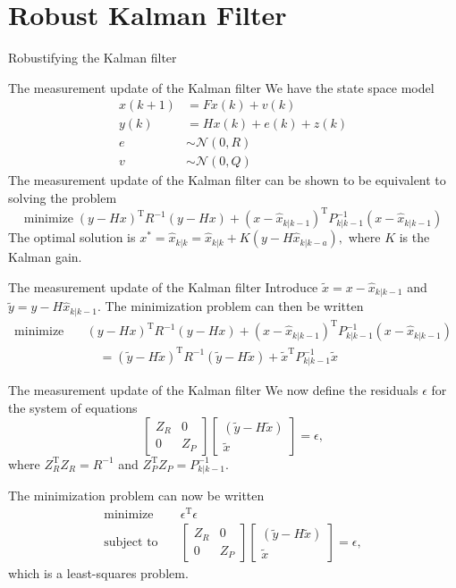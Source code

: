 \documentclass[presentation,aspectratio=169]{beamer}
\renewcommand{\transp}{^{\mathrm{T}}}
\begin{document}
\section{Robust Kalman Filter}
\label{sec-3}
\begin{frame}[label=sec-3-1]{Robustifying the Kalman filter}
\end{frame}
\begin{frame}[label=sec-3-2]{The measurement update of the Kalman filter}
We have the state space model
\begin{align*}
x(k+1) &= Fx(k) + v(k)\\
y(k) &= Hx(k) + e(k) + z(k)\\
e &\sim \mathcal{N}(0,R)\\
v &\sim \mathcal{N}(0,Q)
\end{align*}
The measurement update of the Kalman filter can be shown to be equivalent to solving the problem
\[ \text{minimize} \; (y-Hx)^{\mathrm{T}} R^{-1}(y-Hx) + (x-\hat{x}_{k|k-1})\transp P_{k|k-1}^{-1}(x-\hat{x}_{k|k-1}) \]
The optimal solution is \( x^*=\hat{x}_{k|k} = \hat{x}_{k|k} + K(y-H\hat{x}_{k|k-a}),\) where $K$ is the Kalman gain.
\end{frame}
\begin{frame}[label=sec-3-3]{The measurement update of the Kalman filter}
Introduce $\tilde{x} = x - \hat{x}_{k|k-1}$ and $\tilde{y} = y - H\hat{x}_{k|k-1}$. 
The minimization problem can then be written
\begin{align*}
\text{minimize} \quad  &(y-Hx)^{\mathrm{T}} R^{-1}(y-Hx) + (x-\hat{x}_{k|k-1})\transp P_{k|k-1}^{-1}(x-\hat{x}_{k|k-1})\\
  & \quad = (\tilde{y} -H\tilde{x})\transp R^{-1}(\tilde{y}-H\tilde{x}) + \tilde{x}\transp P_{k|k-1}^{-1}\tilde{x}
 \end{align*}
\end{frame}
\begin{frame}[label=sec-3-4]{The measurement update of the Kalman filter}
We now define the residuals $\epsilon$ for the system of equations
\[ \begin{bmatrix} Z_R & 0\\0 & Z_P \end{bmatrix} \begin{bmatrix}(\tilde{y}-H\tilde{x})\\ \tilde{x} \end{bmatrix} = \epsilon,\]
where $Z_R\transp Z_R = R^{-1}$ and $Z_P\transp Z_P = P_{k|k-1}^{-1}$. 

The minimization problem can now be written
\begin{align*}
\text{minimize} \quad  & \epsilon\transp\epsilon \\
\text{subject to} \quad & \begin{bmatrix} Z_R & 0\\0 & Z_P \end{bmatrix} \begin{bmatrix}(\tilde{y}-H\tilde{x})\\ \tilde{x} \end{bmatrix} = \epsilon,
 \end{align*}
which is a least-squares problem.
\end{frame}
\end{document}
